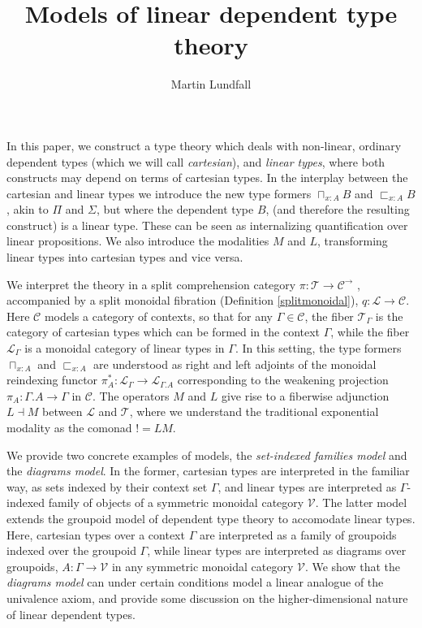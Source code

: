 
\usepackage[margin=0.5in]{geometry}
\usepackage{todonotes}

\newtheorem{lemm}[thm]{Lemma}
\newtheorem{remrk}[thm]{Remark}
\newtheorem{corl}[thm]{Corollary}
\newtheorem{expl}[thm]{Example}
\newtheorem{hyp}[thm]{Hypothesis}

\title{Models of linear dependent type theory}
\author{Martin Lundfall}
\maketitle
\abstract
In this paper, we construct a type theory which deals with non-linear, ordinary dependent types (which we will call \textit{cartesian}), and \textit{linear types}, where both constructs may depend on terms of cartesian types. In the interplay between the cartesian and linear types we introduce the new type formers $\sqcap_{x : A}B$ and $\sqsubset_{x : A}B$, akin to $\Pi$ and $\Sigma$, but where the dependent type $B$, (and therefore the resulting construct) is a linear type. These can be seen as internalizing quantification over linear propositions. We also introduce the modalities $M$ and $L$, transforming linear types into cartesian types and vice versa.

We interpret the theory in a split comprehension category $\pi : \mathcal{T} \to \mathcal{C}^\to$ \cite{jacobs}, accompanied by a split monoidal fibration (Definition \ref{splitmonoidal}), $q : \mathcal{L} \to \mathcal{C}$. Here $\mathcal{C}$ models a category of contexts, so that for any $\Gamma \in \mathcal{C}$, the fiber $\mathcal{T}_\Gamma$ is the category of cartesian types which can be formed in the context $\Gamma$, while the fiber $\mathcal{L}_\Gamma$ is a monoidal category of linear types in $\Gamma$. In this setting, the type formers $\sqcap_{x :A}$ and $\sqsubset_{x : A}$ are understood as right and left adjoints of the monoidal reindexing functor $\pi_A^* : \mathcal{L}_\Gamma \to \mathcal{L}_{\Gamma.A}$ corresponding to the weakening projection $\pi_A : \Gamma.A \to \Gamma$ in $\mathcal{C}$. The operators $M$ and $L$ give rise to a fiberwise adjunction $L \dashv M$ between $\mathcal{L}$ and $\mathcal{T}$, where we understand the traditional exponential modality as the comonad $! = LM$.

We provide two concrete examples of models, the \textit{set-indexed families model} and the \textit{diagrams model}. In the former, cartesian types are interpreted in the familiar way, as sets indexed by their context set $\Gamma$, and linear types are interpreted as $\Gamma$-indexed family of objects of a symmetric monoidal category $\mathcal{V}$. The latter model extends the groupoid model of dependent type theory \cite{hofmann1998} to accomodate linear types. Here, cartesian types over a context $\Gamma$ are interpreted as a family of groupoids indexed over the groupoid $\Gamma$, while linear types are interpreted as diagrams over groupoids, $A : \Gamma \to \mathcal{V}$ in any symmetric monoidal category $\mathcal{V}$. We show that the \textit{diagrams model} can under certain conditions model a linear analogue of the univalence axiom, and provide some discussion on the higher-dimensional nature of linear dependent types.
\newpage
\tableofcontents
\newpage
